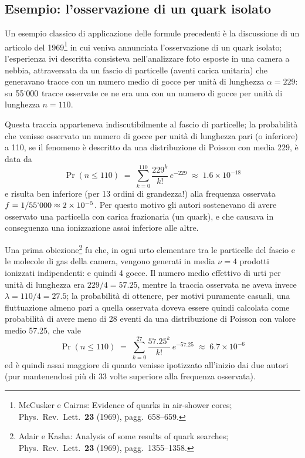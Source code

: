\subsection{Esempio: l'osservazione di un quark isolato}
Un esempio classico di applicazione delle formule precedenti
\`e la discussione di un articolo del
1969\/\footnote{McCusker e Cairns: Evidence of quarks in
  air-shower cores; Phys.~Rev.~Lett.~\textbf{23} (1969),
  pagg.~658--659.} in cui veniva annunciata l'osservazione
di un quark isolato; l'esperienza ivi descritta consisteva
nell'analizzare foto esposte in una camera a nebbia,
attraversata da un fascio di particelle (aventi carica
unitaria) che generavano tracce con un numero medio di gocce
per unit\`a di lunghezza $\alpha = 229$: su $55\updot 000$
tracce osservate ce ne era una con un numero di gocce per
unit\`a di lunghezza $n = 110$.

Questa traccia apparteneva indiscutibilmente al fascio di
particelle; la probabilit\`a che venisse osservato un numero
di gocce per unit\`a di lunghezza pari (o inferiore) a 110,
se il fenomeno \`e descritto da una distribuzione di Poisson
con media $229$, \`e data da
\begin{equation*}
  \Pr (n \le 110) \; = \; \sum_{k=0}^{110} \frac{ 229^k }{
    k! } \, e^{- 229} \; \approx \; 1.6 \times 10^{-18}
\end{equation*}
e risulta ben inferiore (per 13 ordini di grandezza!) alla
frequenza osservata $f = 1/55\updot 000 \approx 2 \times
10^{-5}$.  Per questo motivo gli autori sostenevano di avere
osservato una particella con carica frazionaria (un quark),
e che causava in conseguenza una ionizzazione assai
inferiore alle altre.

Una prima obiezione\/\footnote{Adair e Kasha: Analysis of
  some results of quark searches;
  Phys.~Rev.~Lett.~\textbf{23} (1969), pagg.~1355--1358.} fu
che, in ogni urto elementare tra le particelle del fascio e
le molecole di gas della camera, vengono generati in media
$\nu=4$ prodotti ionizzati indipendenti: e quindi 4 gocce.
Il numero medio effettivo di urti per unit\`a di lunghezza
era $229/4 = 57.25$, mentre la traccia osservata ne aveva
invece $\lambda = 110/4 = 27.5$; la probabilit\`a di
ottenere, per motivi puramente casuali, una fluttuazione
almeno pari a quella osservata doveva essere quindi
calcolata come probabilit\`a di avere meno di 28 eventi da
una distribuzione di Poisson con valore medio 57.25, che
vale
\begin{equation*}
  \Pr (n \le 110) \; = \; \sum_{k=0}^{27} \frac{ 57.25^k }{
    k! } \, e^{- 57.25} \; \approx \; 6.7 \times 10^{-6}
\end{equation*}
ed \`e quindi assai maggiore di quanto venisse ipotizzato
all'inizio dai due autori (pur mantenendosi pi\`u di 33
volte superiore alla frequenza osservata).

